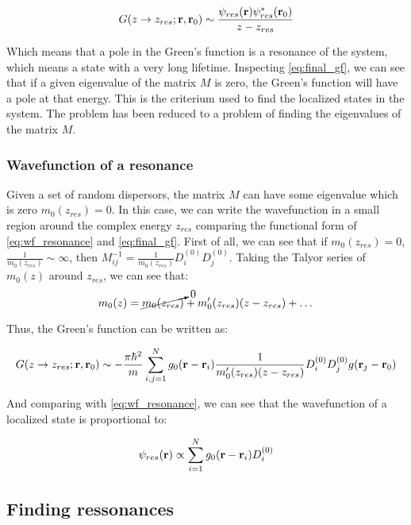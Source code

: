 \begin{equation}
    G(z\to z_{res}; \vb{r},\vb{r}_0)\sim\frac{\psi_{res}(\vb{r})\psi_{res}^*(\vb{r}_0)}{z-z_{res}}
    \label{eq:wf_resonance}
\end{equation}

Which means that a pole in the Green's function is a resonance of the system, which means a state with a very long lifetime. Inspecting \cref{eq:final_gf}, we can see that if a given eigenvalue of the matrix $M$ is zero, the Green's function will have a pole at that energy. This is the criterium used to find the localized states in the system. The problem has been reduced to a problem of finding the eigenvalues of the matrix $M$.

\subsubsection{Wavefunction of a resonance}

Given a set of random dispersors, the matrix $M$ can have some eigenvalue which is zero $m_0(z_{res})=0$. In this case, we can write the wavefunction in a small region around the complex energy $z_{res}$ comparing the functional form of \cref{eq:wf_resonance} and \cref{eq:final_gf}. First of all, we can see that if $m_0(z_{res})=0$, $\frac{1}{m_0(z_{res})}\sim \infty$, then $M^{-1}_{ij}=\frac{1}{m_0(z_{res})}D_i^{(0)}D_j^{(0)}$. Taking the Talyor series of ${m_0(z)}$ around $z_{res}$, we can see that:
\begin{equation}
    m_0(z)=\cancelto{0}{m_0(z_{res})}+m_0'(z_{res})(z-z_{res})+\dots
\end{equation}

Thus, the Green's function can be written as:

\begin{equation}
    G(z\to z_{res};\vb{r},\vb{r}_0)\sim-\frac{\pi\hbar^2}{m}\sum_{i,j=1}^N g_0(\vb{r}-\vb{r}_i) \frac{1}{m_0'(z_{res})(z-z_{res})}D_i^{(0)}D_j^{(0)} g(\vb{r}_j-\vb{r}_0)
\end{equation}

And comparing with \cref{eq:wf_resonance}, we can see that the wavefunction of a localized state is proportional to:

\begin{equation}
    \psi_{res}(\vb{r})\propto \sum_{i=1}^N g_0(\vb{r}-\vb{r}_i)D_i^{(0)}
    \label{eq:wavefunction_resonance}
\end{equation}

\subsection{Finding ressonances}

